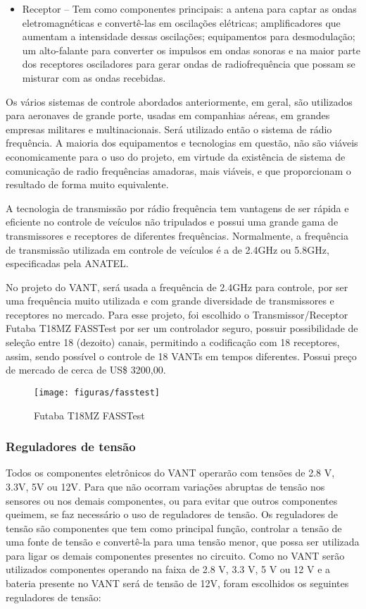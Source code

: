 \begin{itemize}
	\item Receptor – Tem como componentes principais: a antena para captar as ondas eletromagnéticas e convertê-las em oscilações elétricas; amplificadores que aumentam a intensidade dessas oscilações; equipamentos para desmodulação; um alto-falante para converter os impulsos em ondas sonoras e na maior parte dos receptores osciladores para gerar ondas de radiofrequência que possam se misturar com as ondas recebidas.
\end{itemize}

Os vários sistemas de controle abordados anteriormente, em geral, são utilizados para aeronaves de grande porte, usadas em companhias aéreas, em grandes empresas militares e multinacionais. Será utilizado então o sistema de rádio frequência. A maioria dos equipamentos e tecnologias em questão, não são viáveis economicamente para o uso do projeto, em virtude da existência de sistema de comunicação de radio frequências amadoras, mais viáveis, e que proporcionam o resultado de forma muito equivalente.

A tecnologia de transmissão por rádio frequência tem vantagens de ser rápida e eficiente no controle de veículos não tripulados e possui uma grande gama de transmissores e receptores de diferentes frequências. Normalmente, a frequência de transmissão utilizada em controle de veículos é a de 2.4GHz ou 5.8GHz, especificadas pela ANATEL. \cite{anatel2014}

No projeto do VANT, será usada a frequência de 2.4GHz para controle, por ser uma frequência muito utilizada e com grande diversidade de transmissores e receptores no mercado. Para esse projeto, foi escolhido o Transmissor/Receptor Futaba T18MZ FASSTest por ser um controlador seguro, possuir possibilidade de seleção entre 18 (dezoito) canais, permitindo a codificação com 18 receptores, assim, sendo possível o controle de 18 VANTs em tempos diferentes. Possui preço de mercado de cerca de US\$ 3200,00.\cite{futaba2014}

\begin{figure}[H]
\centering\texttt{[image: figuras/fasstest]}
\caption{Futaba T18MZ FASSTest}
\end{figure}

\subsubsection{Reguladores de tensão}

Todos os componentes eletrônicos do VANT operarão com tensões de 2.8 V, 3.3V, 5V ou 12V. Para que não ocorram variações abruptas de tensão nos sensores ou nos demais componentes, ou para evitar que outros componentes queimem, se faz necessário o uso de reguladores de tensão. Os reguladores de tensão são componentes que tem como principal função, controlar a tensão de uma fonte de tensão e convertê-la para uma tensão menor, que possa ser utilizada para ligar os demais componentes presentes no circuito. Como no VANT serão utilizados componentes operando na faixa de 2.8 V, 3.3 V, 5 V ou 12 V e a bateria presente no VANT será de tensão de 12V, foram escolhidos os seguintes reguladores de tensão:

